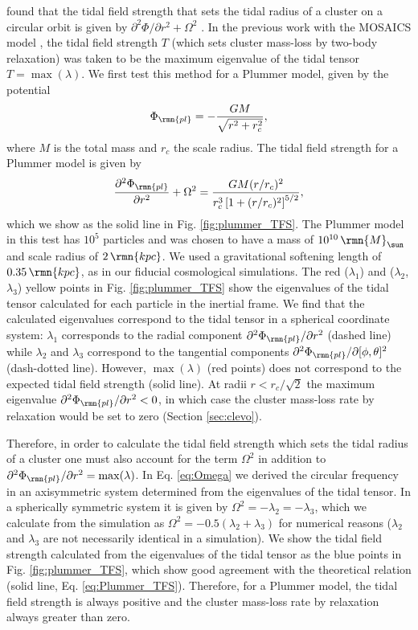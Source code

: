 \documentclass[fleqn,usenatbib]{mnras}
\newcommand\Msun{\,\rmn{M}_{\sun}}
\newcommand\kpc{\,\rmn{kpc}}
\newcommand{\pder}[3][]{\frac{\partial^{#1} #2}{\partial {#3}^{#1}}}
\begin{document}
\citet{King_62} found that the tidal field strength that sets the tidal radius of a cluster on a circular orbit is given by $\partial^2\Phi/\partial r^2 + \Omega^2$ \citep[see also][]{Renaud_Gieles_and_Boily_11}. In the previous work with the MOSAICS model \citep{Kruijssen_et_al_11, Kruijssen_et_al_12}, the tidal field strength $T$ (which sets cluster mass-loss by two-body relaxation) was taken to be the maximum eigenvalue of the tidal tensor $T = \max(\lambda)$. 
We first test this method for a Plummer model, given by the potential
\begin{equation}
\Phi_\rmn{pl} = -\frac{GM}{\sqrt{r^2+r_c^2}} ,
\end{equation}
where $M$ is the total mass and $r_c$ the scale radius. 
The tidal field strength for a Plummer model is given by
\begin{equation} \label{eq:Plummer_TFS}
\pder[2]{\Phi_\rmn{pl}}{r} + \Omega^2 = \frac{G M (r/r_c)^2}{r_c^3 \left[ 1+(r/r_c)^2 \right]^{5/2}} ,
\end{equation}
which we show as the solid line in Fig. \ref{fig:plummer_TFS}.
The Plummer model in this test has $10^5$ particles and was chosen to have a mass of $10^{10} \Msun$ and scale radius of $2 \kpc$. We used a gravitational softening length of $0.35 \kpc$, as in our fiducial cosmological simulations. 
The red ($\lambda_1$) and ($\lambda_2$, $\lambda_3$) yellow points in Fig. \ref{fig:plummer_TFS} show the eigenvalues of the tidal tensor calculated for each particle in the inertial frame. We find that the calculated eigenvalues correspond to the tidal tensor in a spherical coordinate system: $\lambda_1$ corresponds to the radial component $\partial^2\Phi_\rmn{pl}/\partial r^2$ (dashed line) while $\lambda_2$ and $\lambda_3$ correspond to the tangential components $\partial^2\Phi_\rmn{pl}/\partial [\phi,\theta]^2$ (dash-dotted line).
However, $\max(\lambda)$ (red points) does not correspond to the expected tidal field strength (solid line). At radii $r<r_c/\sqrt{2}$ the maximum eigenvalue $\partial^2\Phi_\rmn{pl}/\partial r^2 < 0$, in which case the cluster mass-loss rate by relaxation would be set to zero (Section \ref{sec:clevo}).

Therefore, in order to calculate the tidal field strength which sets the tidal radius of a cluster one must also account for the term $\Omega^2$ in addition to $\partial^2\Phi_\rmn{pl}/\partial r^2=\max(\lambda)$.
In Eq. \ref{eq:Omega} we derived the circular frequency in an axisymmetric system determined from the eigenvalues of the tidal tensor. In a spherically symmetric system it is given by $\Omega^2 = -\lambda_2 = -\lambda_3 $, which we calculate from the simulation as $\Omega^2 = -0.5(\lambda_2 + \lambda_3)$ for numerical reasons ($\lambda_2$ and $\lambda_3$ are not necessarily identical in a simulation). 
We show the tidal field strength calculated from the eigenvalues of the tidal tensor as the blue points in Fig. \ref{fig:plummer_TFS}, which show good agreement with the theoretical relation (solid line, Eq. \ref{eq:Plummer_TFS}). Therefore, for a Plummer model, the tidal field strength is always positive and the cluster mass-loss rate by relaxation always greater than zero.
\end{document}
